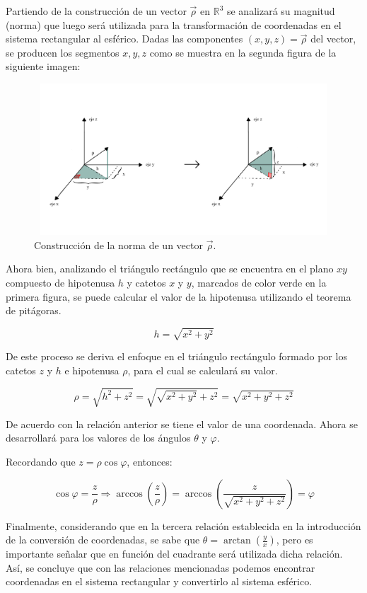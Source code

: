 Partiendo de la construcción de un vector ${\vec{\rho}}$ en ${\mathbb{R}^3}$ se analizará su magnitud (norma) que luego será utilizada para la transformación de coordenadas en el sistema rectangular al esférico. Dadas las componentes ${ \left(x,y,z\right)} = \vec{\rho}$ del vector, se producen los segmentos ${x,y,z}$ como se muestra en la segunda figura de la siguiente imagen:

\begin{figure}[H]
  \centering
  \includegraphics[width=11.17cm, height=5.67cm]{img/graph/norma_vectorial.jpg}
  \caption{Construcción de la norma de un vector ${\vec{\rho}}$.}
  \label{relacion_de_coordenadas}
\end{figure}

Ahora bien, analizando el triángulo rectángulo que se encuentra en el plano ${xy}$ compuesto de hipotenusa ${h}$ y catetos ${x}$ y ${y}$, marcados de color verde en la primera figura, se puede calcular el valor de la hipotenusa utilizando el teorema de pitágoras.

\[ h = \sqrt{x^{2} + y^{2}} \]

\vspace{4mm}
De este proceso se deriva el enfoque en el triángulo rectángulo formado por los catetos ${z}$ y ${h}$ e hipotenusa ${\rho}$, para el cual se calculará su valor.

\[ \rho = \sqrt{h^{2} + z^{2}} = \sqrt{\sqrt{x^{2} + y^{2}} + z^{2}} = \sqrt{x^{2} + y^{2} + z^{2} } \]

De acuerdo con la relación anterior se tiene el valor de una coordenada. Ahora se desarrollará para los valores de los ángulos ${\theta}$ y ${\varphi}$.

Recordando que ${z = \rho \cos \varphi }$, entonces:

\[\cos\varphi = \frac{z}{\rho} \Rightarrow \arccos \left(\frac{z}{\rho}\right) = \arccos \left(\frac{z}{\sqrt{x^{2} + y^{2} + z^{2} }}\right) = \varphi \]

Finalmente, considerando que en la tercera relación establecida en la introducción de la conversión de coordenadas, se sabe que ${\theta = \arctan\left(\frac{y}{x}\right)}$, pero es importante señalar que en función del cuadrante será utilizada dicha relación. Así, se concluye que con las relaciones mencionadas podemos encontrar coordenadas en el sistema rectangular y convertirlo al sistema esférico.
